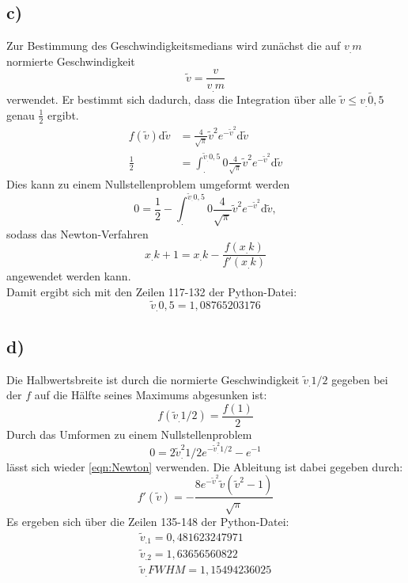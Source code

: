 \subsection*{c)}
Zur Bestimmung des Geschwindigkeitsmedians wird zunächst die auf $v_.m$ normierte Geschwindigkeit
\begin{equation}
  \tilde{v} = \frac{v}{v_.m}
\end{equation}
verwendet.
Er bestimmt sich dadurch, dass die Integration über alle $\tilde{v}\leq \tilde{v_.{0,5}}$ genau $\frac{1}{2}$ ergibt.
\begin{align*}
  f\left(\tilde{v}\right) \text{d}\tilde{v} &= \frac{4}{\sqrt{\pi}}\tilde{v}^2 e^{-\tilde{v}^2} \text{d}\tilde{v}\\
  \frac{1}{2} &= \int^{\tilde{v}_.{0,5}}_.{0} \frac{4}{\sqrt{\pi}}\tilde{v}^2 e^{-\tilde{v}^2} \text{d}\tilde{v}
\end{align*}
\noindent Dies kann zu einem Nullstellenproblem umgeformt werden
\begin{equation}
  0=\frac{1}{2} - \int^{\tilde{v}_.{0,5}}_.{0} \frac{4}{\sqrt{\pi}}\tilde{v}^2 e^{-\tilde{v}^2} \text{d}\tilde{v},
\end{equation}
sodass das Newton-Verfahren
\begin{equation}
  x_.{k+1}=x_.k - \frac{f(x_.k)}{f'(x_.k)}
  \label{eqn:Newton}
\end{equation}
angewendet werden kann.\\
Damit ergibt sich mit den Zeilen 117-132 der Python-Datei:
\begin{equation}
  \tilde{v}_.{0,5}=1,08765203176
\end{equation}


\subsection*{d)}
Die Halbwertsbreite ist durch die normierte Geschwindigkeit $\tilde{v}_.{1/2}$ gegeben bei der $f$ auf die Hälfte seines Maximums abgesunken ist:
\begin{equation}
  f(\tilde{v}_.{1/2})=\frac{f(1)}{2}
\end{equation}
Durch das Umformen zu einem Nullstellenproblem
\begin{equation}
  0=2\tilde{v}^2_.{1/2}e^{-\tilde{v}^2_.{1/2}}- e^{-1}
\end{equation}
lässt sich wieder \eqref{eqn:Newton} verwenden.
Die Ableitung ist dabei gegeben durch:
\begin{equation}
  f'(\tilde{v})=-\frac{8 e^{-\tilde{v}^2}\tilde{v}(\tilde{v}^2-1)}{\sqrt{\pi}}
\end{equation}
Es ergeben sich über die Zeilen 135-148 der Python-Datei:
\begin{gather}
  \tilde{v}_.1=0,481623247971\\
  \tilde{v}_.2=1,63656560822\\
  \tilde{v}_.{FWHM}=1,15494236025
\end{gather}

